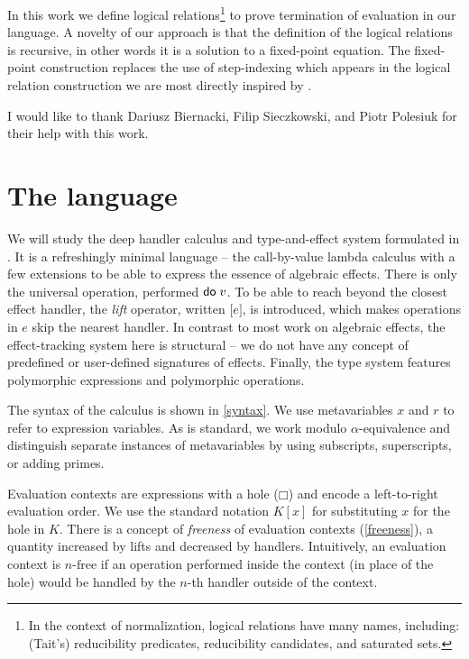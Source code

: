 \documentclass[a4paper, 12pt]{report}
\newcommand{\keyword}[1]{\textsf{\textup{#1}}}
\newcommand{\Do}{\keyword{do}\;}
\newcommand{\Lift}[1]{\boldsymbol{[}#1\boldsymbol{]}}
\newcommand{\Free}{\textrm{-}\mathrm{free}}
\newcommand{\+}{\enspace}
\begin{document}
In this work we define logical relations\footnote{
	In the context of normalization, logical relations have many names, including:
	(Tait's) reducibility predicates, reducibility candidates, and saturated sets.
}
to prove termination
of evaluation in our language.
A novelty of our approach
is that the definition of the logical relations
is recursive, in other words it is a solution to a fixed-point equation.
The fixed-point construction replaces the use of step-indexing %
which appears in the logical relation construction we are most directly inspired by \cite{hwc}.

I would like to thank Dariusz Biernacki, Filip Sieczkowski, and Piotr Polesiuk
for their help with this work.

\chapter{The language}

We will study the deep handler calculus and type-and-effect system formulated
in \cite{fscd19}.
It is a refreshingly minimal language – the call-by-value lambda calculus with a few extensions
to be able to express the essence of algebraic effects.
There is only the universal operation, performed $\Do v$.
To be able to reach beyond the closest effect handler,
the \textit{lift} operator, written $\Lift{e}$, is introduced,
which makes operations in $e$ skip the nearest handler.
In contrast to most work on algebraic effects, the effect-tracking system here is structural –
we do not have any concept of predefined or user-defined signatures of effects.
Finally, the type system features polymorphic expressions and polymorphic operations.

The syntax of the calculus is shown in \cref{syntax}.
We use metavariables $x$ and $r$ to refer to expression variables.
As is standard, we work modulo $α$-equivalence and distinguish separate instances
of metavariables by using subscripts, superscripts, or adding primes.

Evaluation contexts are expressions with a hole ($□$) and
encode a left-to-right evaluation order.
We use the standard notation $K[x]$ for substituting $x$ for the hole in $K$.
There is a concept of {\em freeness} of evaluation contexts (\cref{freeness}),
a quantity increased by lifts and decreased by handlers.
Intuitively, an evaluation context is $n\Free$
if an operation performed inside the context (in place of the hole) %
would be handled by the $n$-th handler outside of the context.
\end{document}
